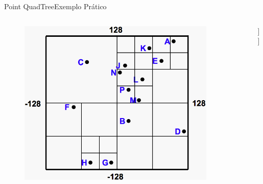 \documentclass[red, tikz, aspectratio=169, xcolor=dvipsnames]{beamer}
\begin{document}
			
			\begin{frame}[fragile]{Point QuadTree}{Exemplo Prático}
				\centering
				\vspace{-40px}
				\begin{columns}
					\begin{column}{0.48\textwidth}
						\begin{figure}
							\centering
							\includegraphics[width=0.9\textwidth]{img/pr-quad.png}
						\end{figure}
					\end{column}
					\begin{column}{0.5\textwidth}
						\centering
						\fbox{
							\begin{forest}
								[\texttt{(x,y)}
								[NO]
								[NE]
								[SO]
								[SE]
								]
						\end{forest}}
						
						\begin{forest}
							[x
							[\texttt{C}
							]
							[\texttt{A}
							]
							[x]
							[x
							[\texttt{B}]
							[\texttt{D}]
							[x]
							[x]
							]
							]
						\end{forest}
						
					\end{column}
				\end{columns}
			\end{frame}
			
			
			
\end{document}
